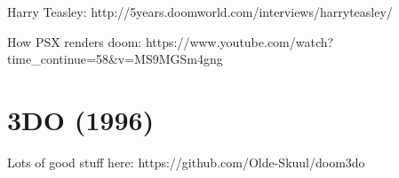 Harry Teasley: http://5years.doomworld.com/interviews/harryteasley/\\
\par
{}
How PSX renders doom: https://www.youtube.com/watch?time\_continue=58\&v=MS9MGSm4gng\\
\par











\section{3DO (1996)}
Lots of good stuff here: https://github.com/Olde-Skuul/doom3do\\
\par
{}
\par
